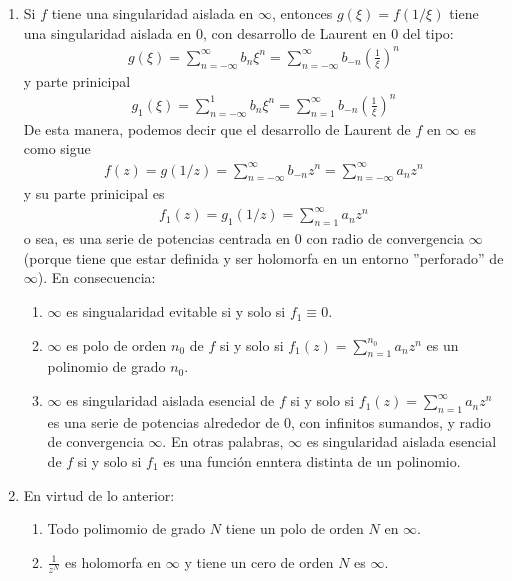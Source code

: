\begin{obs}
\begin{enumerate}
    \item Si $f$ tiene una singularidad aislada en $\infty$, entonces $g(\xi) = f(1/\xi)$ tiene una singularidad aislada en $0$, con desarrollo de Laurent en $0$ del tipo:
    \begin{align*}
        g(\xi) = \sum_{n=-\infty}^{\infty}{b_n \xi^n} = \sum_{n=-\infty}^{\infty}{b_{-n} \left(\frac{1}{\xi}\right)^n} 
    \end{align*}
    y parte prinicipal
    \begin{align*}
        g_1(\xi) = \sum_{n=-\infty}^{1}{b_n \xi^n} = \sum_{n=1}^{\infty}{b_{-n} \left(\frac{1}{\xi}\right)^n} 
    \end{align*}
    De esta manera, podemos decir que el desarrollo de Laurent de $f$ en $\infty$ es como sigue
    \begin{align*}
        f(z) = g(1/z) = \sum_{n=-\infty}^{\infty}{b_{-n}z^n} = \sum_{n=-\infty}^{\infty}{a_nz^n}
    \end{align*}
    y su parte prinicipal es
    \begin{align*}
        f_1(z) = g_1(1/z) = \sum_{n=1}^{\infty}{a_nz^n}
    \end{align*}
    o sea, es una serie de potencias centrada en 0 con radio de convergencia $\infty$ (porque tiene que estar definida y ser holomorfa en un entorno ''perforado'' de $\infty$). En consecuencia:
    \begin{enumerate}
        \item $\infty$ es singualaridad evitable si y solo si $f_1 \equiv 0$.
        \item $\infty$ es polo de orden $n_0$ de $f$ si y solo si $f_1(z) = \sum_{n=1}^{n_0}{a_nz^n}$ es un polinomio de grado $n_0$.
        \item $\infty$ es singularidad aislada esencial de $f$ si y solo si $f_1(z) = \sum_{n=1}^{\infty}{a_nz^n}$ es una serie de potencias alrededor de 0, con infinitos sumandos, y radio de convergencia $\infty$. En otras palabras, $\infty$ es singularidad aislada esencial de $f$ si y solo si $f_1$ es una función enntera distinta de un polinomio.
    \end{enumerate}
    \item En virtud de lo anterior:
    \begin{enumerate}
        \item Todo polimomio de grado $N$ tiene un polo de orden $N$ en $\infty$.
        \item $\frac{1}{z^N}$ es holomorfa en $\infty$ y tiene un cero de orden $N$ es $\infty$.

\end{enumerate}
\end{enumerate}
\end{obs}
